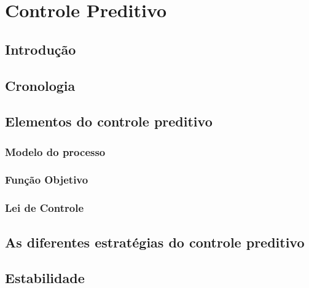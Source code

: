 \chapter{Controle Preditivo}
\label{ch:controle_preditivo}

\section{Introdução}


\section{Cronologia}
\label{sec:cronologia}


\section{Elementos do controle preditivo}
\label{sec:elementos_do_controle_preditivo}


\subsection{Modelo do processo}
\label{subsec:modelo_do_processo}


\subsection{Função Objetivo}
\label{subsec:funcao_objetivo}


\subsection{Lei de Controle}
\label{subsec:lei_de_controle}


\section{As diferentes estratégias do controle preditivo}
\label{sec:diferentes_estrategias_controle_preditivo}


\section{Estabilidade}
\label{sec:estabilidade}

